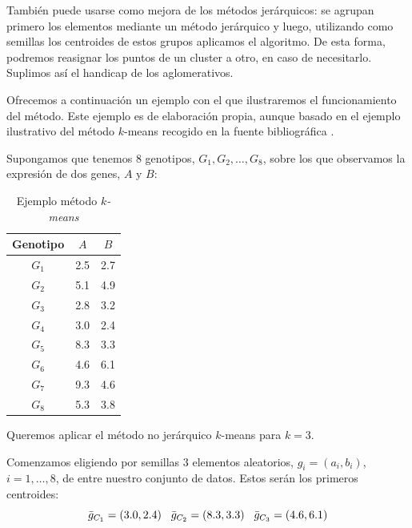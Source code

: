 También puede usarse como mejora de los métodos jerárquicos: se agrupan primero los elementos mediante un método jerárquico y luego, utilizando como semillas los centroides de estos grupos
aplicamos el algoritmo. De esta forma, podremos reasignar los puntos de un cluster a otro, en caso de necesitarlo. Suplimos así el handicap de los aglomerativos. \newline

Ofrecemos a continuación un ejemplo con el que ilustraremos el funcionamiento del método. Este ejemplo es de elaboración propia, aunque basado en el ejemplo ilustrativo del método 
$k$-means recogido en la fuente bibliográfica \cite{quesada-tfg}.

\begin{ejemplo}
    Supongamos que tenemos $8$ genotipos, $G_{1}, G_{2},\dots,G_{8}$, sobre los que observamos la expresión de dos genes, $A$ y $B$:

    \begin{table}[h]
        \centering
        \begin{tabular}{|c|c|c|}
            \hline
            \textbf{Genotipo} & \textbf{$A$} & \textbf{$B$} \\
            \hline
            $G_{1}$ & 2.5 & 2.7 \\
            \hline
            $G_{2}$ & 5.1 & 4.9 \\
            \hline
            $G_{3}$ & 2.8 & 3.2 \\
            \hline
            $G_{4}$ & 3.0 & 2.4 \\
            \hline
            $G_{5}$ & 8.3 & 3.3 \\
            \hline
            $G_{6}$ & 4.6 & 6.1 \\
            \hline
            $G_{7}$ & 9.3 & 4.6 \\
            \hline
            $G_{8}$ & 5.3 & 3.8\\
            \hline
            
        \end{tabular}
        \caption{Ejemplo método \textit{$k$-means}}

    \end{table}

    Queremos aplicar el método no jerárquico $k$-means para $k=3$. \newline

    Comenzamos eligiendo por semillas $3$ elementos aleatorios, $g_{i} = (a_{i},b_{i})$, $i=1,\dots,8$, de entre nuestro conjunto de datos. Estos
    serán los primeros centroides:
    \[
    \bar{g}_{C_{1}} = (3.0,2.4) \hspace{0.3cm} \bar{g}_{C_{2}} = (8.3,3.3) \hspace{0.3cm} \bar{g}_{C_{3}} = (4.6,6.1)
    \]


\end{ejemplo}
